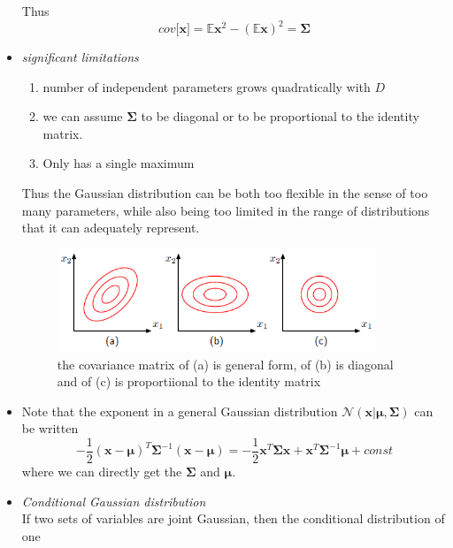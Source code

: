 \documentclass[12pt, a4paper]{article}
\begin{document}
\begin{itemize}
\begin{equation}
        \end{equation}
        Thus
        \begin{equation}
            cov\lbrack\bm{x}\rbrack=\mathbb{E}\bm{x}^2-(\mathbb{E}\bm{x})^2=\bm{\Sigma}
        \end{equation}
        \item \textit{significant limitations}
        \begin{enumerate}
            \item number of independent parameters grows quadratically with $D$
            \item we can assume $\bm{\Sigma}$ to be diagonal or to be proportional to the identity 
            matrix. 
            \item Only has a single maximum
        \end{enumerate}
        Thus the Gaussian distribution can be both too flexible in the sense of too many parameters, 
        while also being too limited in the range of distributions that it can adequately represent.
        \begin{figure}[htbp]
            \centering
            \includegraphics[width=0.9\textwidth]{figures/Figure2_8.png}
            \caption{the covariance matrix of (a) is general form, of (b) is diagonal and
            of (c) is proportiional to the identity matrix}
        \end{figure}
        \item Note that the exponent in a general Gaussian distribution $\mathcal{N}(\bm{x}|\bm{\mu},
        \bm{\Sigma})$ can be written
        \begin{equation*}
            -\frac{1}{2}(\bm{x}-\bm{\mu})^T\bm{\Sigma}^{-1}(\bm{x}-\bm{\mu})=-\frac{1}{2}\bm{x}^T
            \bm{\Sigma}\bm{x}+\bm{x}^T\bm{\Sigma}^{-1}\bm{\mu}+const
        \end{equation*}
        where we can directly get the $\bm{\Sigma}$ and $\bm{\mu}$.
        \item \textit{Conditional Gaussian distribution}\\
        If two sets of variables are joint Gaussian, then the conditional distribution of one 

\end{itemize}
\end{document}
